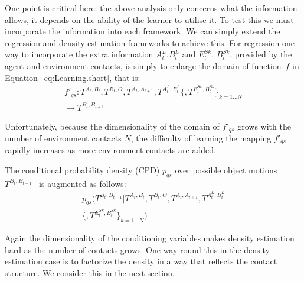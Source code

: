 One point is critical here: the above analysis only concerns what the
information allows, it depends on the ability of the learner to
utilise it.  To test this we must incorporate the information into
each framework. We can simply extend the regression and density
estimation frameworks to achieve this. For regression one way to
incorporate the extra information $A^{L}_{t}$,$B^{L}_{t}$ and
$E^{Sk}_t$\hspace{-6pt}, $B^{Sk}_t$, provided by the agent and
environment contacts, is simply to enlarge the domain of function~$f$
in Equation~\eqref{eq:Learning.short}, that is:
\begin{multline}
f'_{qs}: T^{A_t, B_t}, T^{B_t, O}, T^{A_{t}, A_{t+1}}, T^{A^{L}_t, B^{L}_t}\{, T^{E^{Sk}_t,B^{Sk}_t}\}_{k=1 \ldots N} \\ 
\longrightarrow T^{B_{t}, B_{t+1}}
\label{eq:Learning.augmented}
\end{multline}

\noindent Unfortunately, because the dimensionality of the domain of $f'_{qs}$ grows with the number of environment contacts $N$,
the difficulty of learning the mapping $f'_{qs}$ rapidly increases
as more environment contacts are added.


The conditional probability density (CPD) $p_{qs}$ over possible object motions $T^{B_{t}, B_{t+1}}$~\cite{kopicki_prediction_2009} is augmented as follows:
\begin{multline}
p_{qs}(T^{B_{t}, B_{t+1}} | T^{A_t, B_t}, T^{B_t, O}, T^{A_{t}, A_{t+1}}, T^{A^{L}_t, B^{L}_t}\\
\{, T^{E^{Sk}_t,B^{Sk}_t}\}_{k=1 \ldots N})
\label{eq:Learning.density}
\end{multline}

Again the dimensionality of the conditioning variables makes density
estimation hard as the number of contacts grows. One way round this in the density estimation case is to factorize the density in a way that
reflects the contact structure. We consider this in the next section. 